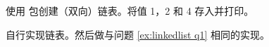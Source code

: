 \begin{Exercise}[title={链表},difficulty=6]
\label{ex:linkedlist}
\Question
\label{ex:linkedlist q1}
使用  包创建（双向）链表。将值 1，2 和 4 存入并打印。

\Question
自行实现链表。然后做与问题 \ref{ex:linkedlist q1} 相同的实现。
\end{Exercise}

\begin{Answer}
\Question

\Question
\end{Answer}
